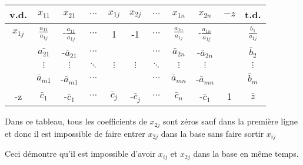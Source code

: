 \begin{center}
	\renewcommand{\arraystretch}{1.5}
	\begin{tabular}{|c|ccccccccc|c|}
		\hline
		  v.d.   &        $x_{11}$         &         $x_{21}$         & $\cdots$ &  $x_{1j}$   &   $x_{2j}$   & $\cdots$ &        $x_{1n}$         &         $x_{2n}$         & $-z$ &          t.d.          \\ \hline
		$x_{1j}$ & $\frac{a_{11}}{a_{1j}}$ & -$\frac{a_{11}}{a_{1j}}$ & $\cdots$ &      1      &      -1      & $\cdots$ & $\frac{a_{1n}}{a_{1j}}$ & -$\frac{a_{1n}}{a_{1j}}$ &      & $\frac{b_{1}}{a_{1j}}$ \\
		         &     $\bar{a_{21}}$      &     -$\bar{a}_{21}$      & $\cdots$ &             &              & $\cdots$ &     $\bar{a}_{2n}$      &     -$\bar{a}_{2n}$      &      &     $\bar{b}_{2}$      \\
		         &        $\vdots$         &         $\vdots$         & $\ddots$ &  $\vdots$   &   $\vdots$   & $\ddots$ &        $\vdots$         &         $\vdots$         &      &        $\vdots$        \\
		         &     $\bar{a}_{m1}$      &     -$\bar{a}_{m1}$      & $\cdots$ &             &              & $\cdots$ &     $\bar{a}_{mn}$      &     -$\bar{a}_{mn}$      &      &      $\bar{b}_m$       \\ \hline
		   -z    &      $\bar{c}_{1}$      &       -$\bar{c}_1$       & $\cdots$ & $\bar{c}_j$ & -$\bar{c}_j$ & $\cdots$ &       $\bar{c}_n$       &       -$\bar{c}_1$       &  1   &       $\bar{z}$        \\ \hline
	\end{tabular}
\end{center}

Dans ce tableau, tous les coefficients de $x_{2j}$ sont zéros sauf dans la première ligne et donc il est impossible de faire entrer $x_{2j}$ dans la base sans faire sortir $x_{ij}$

Ceci démontre qu’il est impossible d’avoir $x_{ij}$ et $x_{2j}$ dans la base en même temps.
